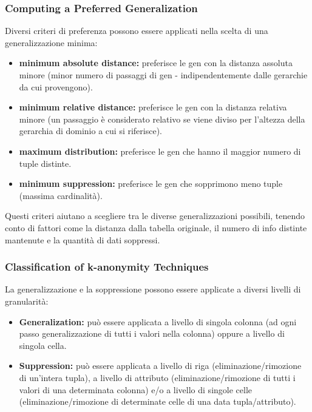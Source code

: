 \documentclass{report}
\begin{document}
\subsubsection{Computing a Preferred Generalization}
Diversi criteri di preferenza possono essere applicati nella scelta di una generalizzazione minima:

\begin{itemize}
    \item \textbf{minimum absolute distance:} preferisce le gen con la distanza assoluta minore (minor numero di passaggi di gen - indipendentemente dalle gerarchie da cui provengono).
    \item \textbf{minimum relative distance:} preferisce le gen con la distanza relativa minore (un passaggio è considerato relativo se viene diviso per l'altezza della gerarchia di dominio a cui si riferisce).
    \item \textbf{maximum distribution:} preferisce le gen che hanno il maggior numero di tuple distinte.
    \item \textbf{minimum suppression:} preferisce le gen che sopprimono meno tuple (massima cardinalità).
\end{itemize}

\noindent Questi criteri aiutano a scegliere tra le diverse generalizzazioni possibili, tenendo conto di fattori come la distanza dalla tabella originale, il numero di info distinte mantenute e la quantità di dati soppressi.

\subsubsection{Classification of k-anonymity Techniques}
La generalizzazione e la soppressione possono essere applicate a diversi livelli di granularità:

\begin{itemize}
    \item \textbf{Generalization:} può essere applicata a livello di singola colonna (ad ogni passo generalizzazione di tutti i valori nella colonna) oppure a livello di singola cella.
    \item \textbf{Suppression:} può essere applicata a livello di riga (eliminazione/rimozione di un'intera tupla), a livello di attributo (eliminazione/rimozione di tutti i valori di una determinata colonna) e/o a livello di singole celle (eliminazione/rimozione di determinate celle di una data tupla/attributo).
\end{itemize}
\end{document}
